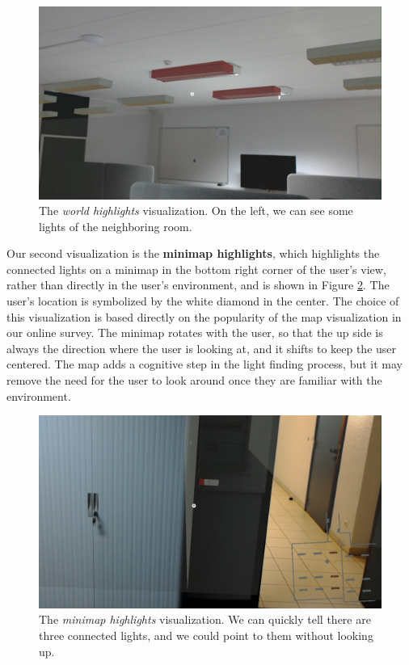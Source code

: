 \begin{figure}
    \centering
    \includegraphics[width=1.0\linewidth]{resources/implementation/world_highlights.jpg}
    \caption{The \textit{world highlights} visualization. On the left, we can see some lights of the neighboring room.}
    \label{fig:world_highlights_vis}
\end{figure}

Our second visualization is the \textbf{minimap highlights}, which highlights the connected lights on a minimap in the bottom right corner of the user's view, rather than directly in the user's environment, and is shown in Figure \ref{fig:minimap_highlights_vis}. The user's location is symbolized by the white diamond in the center. The choice of this visualization is based directly on the popularity of the map visualization in our online survey. The minimap rotates with the user, so that the up side is always the direction where the user is looking at, and it shifts to keep the user centered. The map adds a cognitive step in the light finding process, but it may remove the need for the user to look around once they are familiar with the environment.

\begin{figure}
    \centering
    \includegraphics[width=1.0\linewidth]{resources/implementation/minimap_highlights.jpg}
    \caption{The \textit{minimap highlights} visualization. We can quickly tell there are three connected lights, and we could point to them without looking up.}
    \label{fig:minimap_highlights_vis}
\end{figure}

